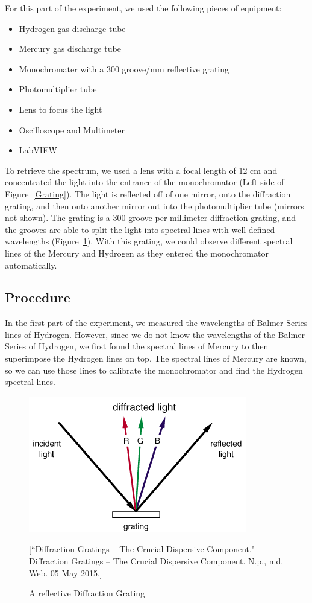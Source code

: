 For this part of the experiment, we used the following pieces of equipment:
\begin{itemize}
\item Hydrogen gas discharge tube
\item Mercury gas discharge tube
\item Monochromater with a 300 groove/mm reflective grating
\item Photomultiplier tube
\item Lens to focus the light
\item Oscilloscope and Multimeter
\item LabVIEW
\end{itemize}

To retrieve the spectrum, we used a lens with a focal length of 12 cm and concentrated the light into the entrance of the monochromator (Left side of Figure~\ref{Grating}). The light is reflected off of one mirror, onto the diffraction grating, and then onto another mirror out into the photomultiplier tube (mirrors not shown). The grating is a 300 groove per millimeter diffraction-grating, and the grooves are able to split the light into spectral lines with well-defined wavelengths (Figure~\ref{Reflective}). With this grating, we could observe different spectral lines of the Mercury and Hydrogen as they entered the monochromator automatically. 

\subsection{Procedure}
In the first part of the experiment, we measured the wavelengths of Balmer Series lines of Hydrogen. However, since we do not know the wavelengths of the Balmer Series of Hydrogen, we first found the spectral lines of Mercury to then superimpose the Hydrogen lines on top. The spectral lines of Mercury are known, so we can use those lines to calibrate the monochromator and find the Hydrogen spectral lines.

\begin{figure}[t]
  \includegraphics[width = 5 cm]{Diffraction.png}
  \begin{center}
  \caption{A reflective Diffraction Grating}[\footnotesize{``Diffraction Gratings – The Crucial Dispersive Component." Diffraction Gratings – The Crucial Dispersive Component. N.p., n.d. Web. 05 May 2015.}]
  \label{Reflective}
  \end{center}
\end{figure}


